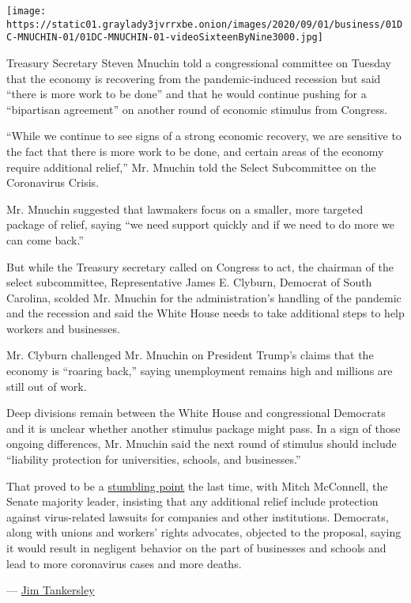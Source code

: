 \texttt{[image: https://static01.graylady3jvrrxbe.onion/images/2020/09/01/business/01DC-MNUCHIN-01/01DC-MNUCHIN-01-videoSixteenByNine3000.jpg]}

Treasury Secretary Steven Mnuchin told a congressional committee on
Tuesday that the economy is recovering from the pandemic-induced
recession but said ``there is more work to be done'' and that he would
continue pushing for a ``bipartisan agreement'' on another round of
economic stimulus from Congress.

``While we continue to see signs of a strong economic recovery, we are
sensitive to the fact that there is more work to be done, and certain
areas of the economy require additional relief,'' Mr. Mnuchin told the
Select Subcommittee on the Coronavirus Crisis.

Mr. Mnuchin suggested that lawmakers focus on a smaller, more targeted
package of relief, saying ``we need support quickly and if we need to do
more we can come back.''

But while the Treasury secretary called on Congress to act, the chairman
of the select subcommittee, Representative James E. Clyburn, Democrat of
South Carolina, scolded Mr. Mnuchin for the administration's handling of
the pandemic and the recession and said the White House needs to take
additional steps to help workers and businesses.

Mr. Clyburn challenged Mr. Mnuchin on President Trump's claims that the
economy is ``roaring back,'' saying unemployment remains high and
millions are still out of work.

Deep divisions remain between the White House and congressional
Democrats and it is unclear whether another stimulus package might pass.
In a sign of those ongoing differences, Mr. Mnuchin said the next round
of stimulus should include ``liability protection for universities,
schools, and businesses.''

That proved to be a
\href{https://www.nytimes3xbfgragh.onion/2020/08/05/us/politics/liability-shield-business-coronavirus.html}{stumbling
point} the last time, with Mitch McConnell, the Senate majority leader,
insisting that any additional relief include protection against
virus-related lawsuits for companies and other institutions. Democrats,
along with unions and workers' rights advocates, objected to the
proposal, saying it would result in negligent behavior on the part of
businesses and schools and lead to more coronavirus cases and more
deaths.

--- \href{https://www.nytimes3xbfgragh.onion/by/jim-tankersley}{Jim
Tankersley}


